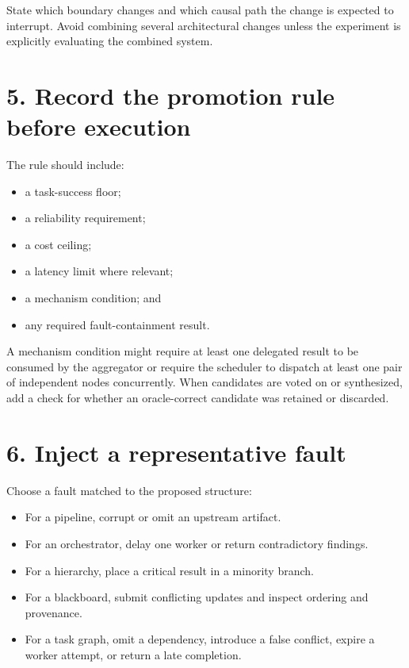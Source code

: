 State which boundary changes and which causal path the change is expected to interrupt. Avoid combining several architectural changes unless the experiment is explicitly evaluating the combined system.

\section{5. Record the promotion rule before execution}\label{record-the-promotion-rule-before-execution}

The rule should include:

\begin{itemize}
\tightlist
\item
  a task-success floor;
\item
  a reliability requirement;
\item
  a cost ceiling;
\item
  a latency limit where relevant;
\item
  a mechanism condition; and
\item
  any required fault-containment result.
\end{itemize}

A mechanism condition might require at least one delegated result to be consumed by the aggregator or require the scheduler to dispatch at least one pair of independent nodes concurrently. When candidates are voted on or synthesized, add a check for whether an oracle-correct candidate was retained or discarded.

\section{6. Inject a representative fault}\label{inject-a-representative-fault}

Choose a fault matched to the proposed structure:

\begin{itemize}
\tightlist
\item
  For a pipeline, corrupt or omit an upstream artifact.
\item
  For an orchestrator, delay one worker or return contradictory findings.
\item
  For a hierarchy, place a critical result in a minority branch.
\item
  For a blackboard, submit conflicting updates and inspect ordering and provenance.
\item
  For a task graph, omit a dependency, introduce a false conflict, expire a worker attempt, or return a late completion.
\end{itemize}

